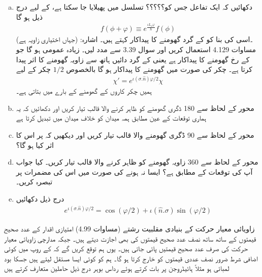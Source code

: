 \begin{enumerate}[a.]
\item  دکھائیں کہ ایک تفاعل  جس کو؟؟؟؟؟ تسلسل میں پھیلایا جا سکتا ہے، کے لیے درج ذیل ہو گا 
\begin{align*}
    f(\phi+\varphi)\equiv e^{\frac{\iota L_z\varphi}{\hslash}}f(\phi)
\end{align*} 
(جہاں  اختیاری زاویہ ہے) ۔اسی کی بنا  کو  کے گرد گھومنے کا پیداکار کہتے ہیں۔ اشارہ: مساوات 4.129 استعمال کریں اور سوال 3.39 سے مدد لیں۔ زیادہ عمومی  ہو گا جو  کے رخ گھومنے کا پیداکار ہے یعنی    کے گرد دائیں ہاتھ سے     زاویہ   گھومنے کا اثر پیدا کرتا ہے۔ چکر کی صورت میں گھومنے کا پیداکار   ہو گا بالخصوص  \(1/2\)  چکر کے لیے
\begin{align}
    \chi'=e^{\iota(\sigma.\hat{n})\varphi/2}\chi
\end{align} ہمیں چکر کاروں کے گھومنے کے بارے میں بتاتی ہے۔
\item محور  کے لحاظ سے 180 ڈگری گھومنے کو ظاہر کرنے والا  قالب تیار کریں اور دکھائیں کہ یہ ہماری توقعات کے عین مطابق ہمہ میدان  کو خلاف میدان  میں تبدیل کرتا ہے 
\item محور  کے لحاظ سے 90 ڈگری گھومنے والا قالب تیار کریں اور دیکھیں کہ  پر اس کا اثر کیا ہو گا؟ 
\item محور  کے لحاظ سے 360 زاویہ گھومنے کو ظاہر کرنے والا قالب تیار کریں۔ کیا جواب آپ کی توقعات کے مطابق ہے؟ ایسا نہ ہونے کی صورت میں اس کی مضمرات پر تبصرہ کریں۔
\item درج ذیل دکھائیں 
\begin{align} e^{\iota(\sigma.\hat{n})\varphi/2}=\cos{(\varphi/2)}+\iota(\hat{n}.\sigma)\sin{(\varphi/2)}
\end{align}
\end{enumerate}
زاویائی معیار حرکت کے بنیادی  مقلبیت  رشتے (مساوات 4.99) امتیازی اقدار کے عدد صحیح قیمتوں کے ساتھ ساتھ نصف عدد صحیح قیمتوں کی بھی اجازت دیتے ہیں۔ جبکہ مدارچی زاویائی معیار حرکت کی صرف عدد صحیح قیمتیں پائی جاتی ہیں۔ یوں ہم توقع کریں گے کہ  کے روپ میں کوئی اضافی شرط ضرور نصف عددی قیمتوں کو خارج کرتا ہو گا۔ ہم  کو کوئی ایسا مستقل لیتے ہیں جسکا بود لمبائی ہو مثلاً ہائیڈروجن پر بات کرتے ہوئے رداس بوہر درج ذیل حاملین متعارف کرتے ہیں 
